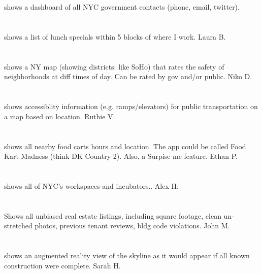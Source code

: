 \section{}shows a dashboard of all NYC government contacts (phone,  email,  twitter). 
\section{}shows a list of lunch specials within 5 blocks of where I work. Laura B.
\section{}shows a NY map (showing districts: like SoHo) that rates the safety of neighborhoods at diff times of day. Can be rated by gov and/or public. Niko D.
\section{}shows accessiblity information (e.g. ramps/elevators) for public transportation on a map based on location. Ruthie V.
\section{}  shows all nearby food carts hours and location. The app could be called Food Kart Madness (think DK Country 2). Also,  a Surpise me feature. Ethan P.
\section{}shows all of NYC's workspaces and incubators.. Alex H.
\section{}Shows all unbiased real estate listings,  including square footage,  clean un-stretched photos,  previous tenant reviews,  bldg code violations. John M.
\section{}shows an augmented reality view of the skyline as it would appear if all known construction were complete. Sarah H.

